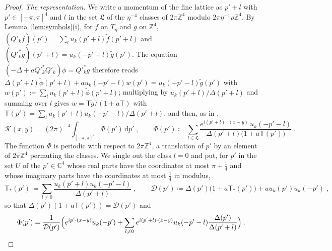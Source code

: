 \documentclass[11pt]{preprint}
\newcommand{\dd}{\mathrm{d}}
\numberwithin{equation}{section}
\theoremstyle{definition}
\theoremstyle{remark}
\theoremstyle{plain}
\begin{document}
\begin{proof}
\emph{The representation.} We write a momentum of the fine lattice as $p' + l$ with $p' \in [-\pi, \pi]^4$ and $l$ in the set $\mathfrak L$ of the $\eta^{-4}$ classes of $2\pi\mathbb Z^4$ modulo $2\pi\eta^{-1}\rho\mathbb Z^4$. By Lemma~\ref{lem:symbols}(i), for $f$ on $T_\eta$ and $g$ on $\mathbb Z^4$, $(\widetilde{Q'_kf})(p') = \sum_lu_k(p' + l)\tilde f(p' + l)$ and $(\widetilde{Q'^*_kg})(p' + l) = u_k(-p' - l)\tilde g(p')$. The equation $(-\Delta + aQ'^*_kQ'_k)\phi = Q'^*_kg$ therefore reads $\Delta(p' + l)\tilde\phi(p' + l) + au_k(-p' - l)w(p') = u_k(-p' - l)\tilde g(p')$ with $w(p') \coloneqq \sum_lu_k(p' + l)\tilde\phi(p' + l)$; multiplying by $u_k(p' + l)/\Delta(p' + l)$ and summing over $l$ gives $w = \mathsf T\tilde g/(1 + a\mathsf T)$ with $\mathsf T(p') = \sum_lu_k(p' + l)u_k(-p' - l)/\Delta(p' + l)$, and then, as in \cite[(2.47), (2.48)]{BalabanRDG},
\begin{equation}\label{eq:kernel-representation}
    \mathcal K(x, y) = (2\pi)^{-4}\int_{[-\pi,\pi]^4}\Phi(p')\,\dd p'\;,
    \qquad
    \Phi(p') \coloneqq \sum_{l \in \mathfrak L}\frac{e^{i(p' + l) \cdot (x - y)}\,u_k(-p' - l)}{\Delta(p' + l)\bigl(1 + a\mathsf T(p')\bigr)}\;.
\end{equation}
The function $\Phi$ is periodic with respect to $2\pi\mathbb Z^4$, a translation of $p'$ by an element of $2\pi\mathbb Z^4$ permuting the classes. We single out the class $l = 0$ and put, for $p'$ in the set $U$ of the $p' \in \mathbb C^4$ whose real parts have the coordinates at most $\pi + \frac14$ and whose imaginary parts have the coordinates at most $\frac14$ in modulus,
\begin{equation}\label{eq:kernel-denominator}
    \mathsf T_*(p') \coloneqq \sum_{l \neq 0}\frac{u_k(p' + l)u_k(-p' - l)}{\Delta(p' + l)}\;,
    \qquad
    \mathcal D(p') \coloneqq \Delta(p')\bigl(1 + a\mathsf T_*(p')\bigr) + au_k(p')u_k(-p')\;,
\end{equation}
so that $\Delta(p')(1 + a\mathsf T(p')) = \mathcal D(p')$ and
\begin{equation}\label{eq:kernel-terms}
    \Phi(p') = \frac{1}{\mathcal D(p')}\Bigl(e^{ip' \cdot (x - y)}u_k(-p') + \sum_{l \neq 0}e^{i(p' + l) \cdot (x - y)}u_k(-p' - l)\frac{\Delta(p')}{\Delta(p' + l)}\Bigr)\;.
\end{equation}


\end{proof}
\end{document}
